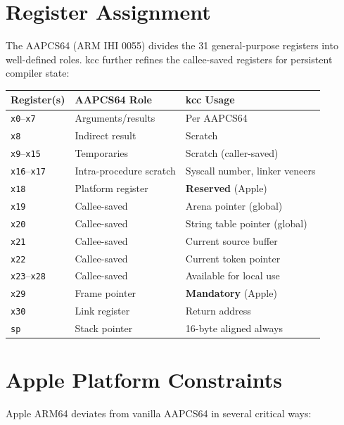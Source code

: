 \documentclass[11pt,a4paper,twoside,openright,DIV=15]{scrbook}
\theoremstyle{definition}
\theoremstyle{plain}
\theoremstyle{remark}
\newcommand{\kcc}{\textsf{kcc}}
\newcommand{\reg}[1]{\texttt{#1}}
\begin{document}
\section{Register Assignment}

The AAPCS64 (ARM IHI 0055) divides the 31 general-purpose registers
into well-defined roles.  \kcc{} further refines the callee-saved
registers for persistent compiler state:

\begin{center}
\begin{tabular}{lll}
\hline
Register(s) & AAPCS64 Role & \kcc{} Usage \\
\hline
\reg{x0}--\reg{x7}   & Arguments/results      & Per AAPCS64 \\
\reg{x8}              & Indirect result         & Scratch \\
\reg{x9}--\reg{x15}   & Temporaries             & Scratch (caller-saved) \\
\reg{x16}--\reg{x17}  & Intra-procedure scratch & Syscall number, linker veneers \\
\reg{x18}             & Platform register       & \textbf{Reserved} (Apple) \\
\reg{x19}             & Callee-saved            & Arena pointer (global) \\
\reg{x20}             & Callee-saved            & String table pointer (global) \\
\reg{x21}             & Callee-saved            & Current source buffer \\
\reg{x22}             & Callee-saved            & Current token pointer \\
\reg{x23}--\reg{x28}  & Callee-saved            & Available for local use \\
\reg{x29}             & Frame pointer           & \textbf{Mandatory} (Apple) \\
\reg{x30}             & Link register           & Return address \\
\reg{sp}              & Stack pointer           & 16-byte aligned always \\
\hline
\end{tabular}
\end{center}

\section{Apple Platform Constraints}

Apple ARM64 deviates from vanilla AAPCS64 in several critical ways:
\end{document}

